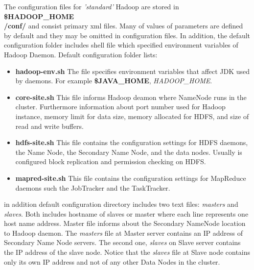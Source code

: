 \documentclass[a4paper,12pt,oneside]{report}
\begin{document}
	The configuration files for \textit{'standard'} Hadoop are stored in
	\textbf{\$HADOOP\_HOME\\/conf/} and consist  primary xml files. Many of values of 
	parameters are defined by default and they may be omitted in configuration files. 
	In addition, the default configuration folder  includes shell file which specified environment variables of Hadoop Daemon. Default configuration folder lists:
	\begin{itemize}\label{conf_files}
		\item \textbf{hadoop-env.sh} The file specifies environment variables that
		affect JDK used by daemons. For example \textbf{\$JAVA\_HOME}, \textit{HADOOP\_HOME}.
		\item \textbf{core-site.sh}   This file informs Hadoop deamon where NameNode
		runs in the cluster. Furthermore 
		information about port number used for Hadoop instance, memory limit for data
		size,  memory allocated for HDFS, and size of read and write buffers.
		\item \textbf{hdfs-site.sh}  This file contains the configuration settings for
		HDFS daemons, the Name Node, the Secondary Name Node, and the data nodes. 
		Usually is configured block	replication and permission checking on HDFS. 
		\item \textbf{mapred-site.sh}  This file contains the configuration settings for
		MapReduce daemons such the JobTracker and the TaskTracker.
	\end{itemize}
	
	in addition default configuration directory includes two text files:
	\textit{masters} and \textit{slaves}. Both includes hostname of slaves or master 
	where each line represents one host name address. 
	Master file informs about the Secondary NameNode location to Hadoop daemon. The
	\textit{masters} file at Master server contains an IP address of Secondary Name Node servers.
	The second one, \textit{slaves} on Slave server contains the IP address of the
	slave node. Notice that the \textit{slaves} file at Slave node contains only its
	own IP address and not of any other Data Nodes in the cluster.
	
	
\end{document}
